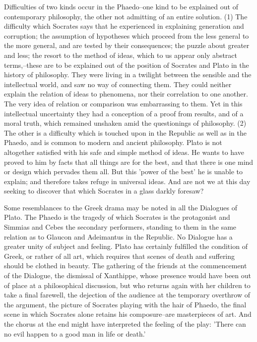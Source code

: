 Difficulties of two kinds occur in the Phaedo--one kind to be explained
out of contemporary philosophy, the other not admitting of an entire
solution. (1) The difficulty which Socrates says that he experienced in
explaining generation and corruption; the assumption of hypotheses which
proceed from the less general to the more general, and are tested by
their consequences; the puzzle about greater and less; the resort to the
method of ideas, which to us appear only abstract terms,--these are to
be explained out of the position of Socrates and Plato in the history of
philosophy. They were living in a twilight between the sensible and
the intellectual world, and saw no way of connecting them. They
could neither explain the relation of ideas to phenomena, nor their
correlation to one another. The very idea of relation or comparison was
embarrassing to them. Yet in this intellectual uncertainty they had a
conception of a proof from results, and of a moral truth, which remained
unshaken amid the questionings of philosophy. (2) The other is a
difficulty which is touched upon in the Republic as well as in the
Phaedo, and is common to modern and ancient philosophy. Plato is not
altogether satisfied with his safe and simple method of ideas. He wants
to have proved to him by facts that all things are for the best, and
that there is one mind or design which pervades them all. But this
'power of the best' he is unable to explain; and therefore takes refuge
in universal ideas. And are not we at this day seeking to discover that
which Socrates in a glass darkly foresaw?

Some resemblances to the Greek drama may be noted in all the Dialogues
of Plato. The Phaedo is the tragedy of which Socrates is the protagonist
and Simmias and Cebes the secondary performers, standing to them in the
same relation as to Glaucon and Adeimantus in the Republic. No Dialogue
has a greater unity of subject and feeling. Plato has certainly
fulfilled the condition of Greek, or rather of all art, which requires
that scenes of death and suffering should be clothed in beauty. The
gathering of the friends at the commencement of the Dialogue, the
dismissal of Xanthippe, whose presence would have been out of place at
a philosophical discussion, but who returns again with her children to
take a final farewell, the dejection of the audience at the temporary
overthrow of the argument, the picture of Socrates playing with the
hair of Phaedo, the final scene in which Socrates alone retains his
composure--are masterpieces of art. And the chorus at the end might have
interpreted the feeling of the play: 'There can no evil happen to a good
man in life or death.'

